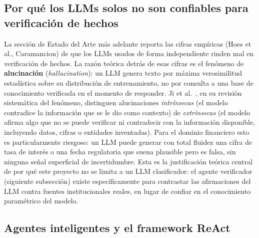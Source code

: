 \subsection{Por qué los LLMs solos no son confiables para verificación de hechos}

La sección de Estado del Arte más adelante reporta las cifras empíricas (Hoes et al., Caramancion) de que los LLMs usados de forma independiente rinden mal en verificación de hechos. La razón teórica detrás de esas cifras es el fenómeno de \textbf{alucinación} (\textit{hallucination}): un LLM genera texto por máxima verosimilitud estadística sobre su distribución de entrenamiento, no por consulta a una base de conocimiento verificada en el momento de responder. Ji et al.~\cite{Ji2023}, en su revisión sistemática del fenómeno, distinguen alucinaciones \textit{intrínsecas} (el modelo contradice la información que se le dio como contexto) de \textit{extrínsecas} (el modelo afirma algo que no se puede verificar ni contradecir con la información disponible, incluyendo datos, cifras o entidades inventadas). Para el dominio financiero esto es particularmente riesgoso: un LLM puede generar con total fluidez una cifra de tasa de interés o una fecha regulatoria que suena plausible pero es falsa, sin ninguna señal superficial de incertidumbre. Esta es la justificación teórica central de por qué este proyecto no se limita a un LLM clasificador: el agente verificador (siguiente subsección) existe específicamente para contrastar las afirmaciones del LLM contra fuentes institucionales reales, en lugar de confiar en el conocimiento paramétrico del modelo.

\subsection{Agentes inteligentes y el framework ReAct}

